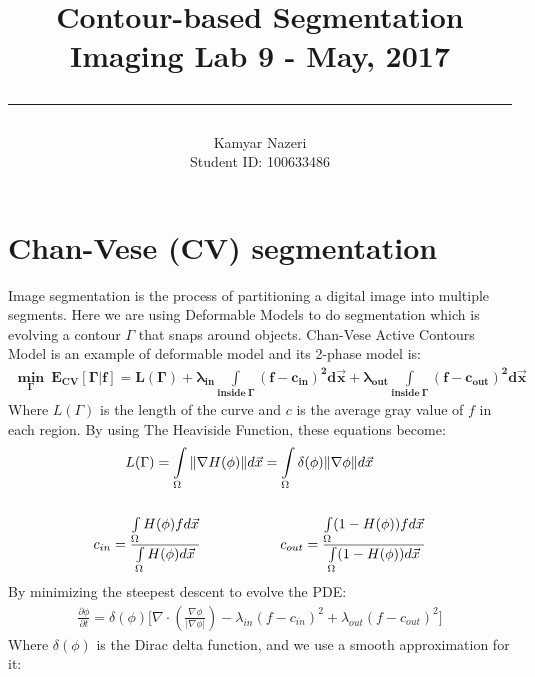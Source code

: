 \documentclass[a4paper,11pt]{article}
\newcommand\tab[1][4mm]{\hspace*{#1}}
\begin{document}
\title{
	\Huge \textbf {Contour-based Segmentation}
    \\ [0.2cm]
	\LARGE Imaging Lab 9 - May, 2017
    \\ [0.5cm]
    \hrule
}

\date{}

\author{
		\Large Kamyar Nazeri \\
		\large Student ID: 100633486 }

\maketitle
\newpage

\section*{Chan-Vese (CV) segmentation}
Image segmentation is the process of partitioning a digital image into multiple segments. Here we are using Deformable Models to do segmentation which is evolving a contour $\Gamma$ that snaps around objects. Chan-Vese Active Contours Model is an example of deformable model and its 2-phase model is:
\begin{align*}
\boldsymbol{\min \limits_{\Gamma}\ E_{CV}[\Gamma|f] = L(\Gamma) + \lambda_{in} \int\limits_{inside\ \Gamma}(f - c_{in})^2 d\vec{x} + \lambda_{out} \int\limits_{inside\ \Gamma}(f - c_{out})^2 d\vec{x}}
\end{align*}
Where $L(\Gamma)$ is the length of the curve and $c$ is the average gray value of $f$ in each region. By using The Heaviside Function, these equations become:
\begin{align*}
& \tab\tab L(\Gamma) = \int\limits_{\Omega} \Vert\nabla H(\phi)\Vert d\vec{x} = \int\limits_{\Omega} \delta(\phi) \Vert\nabla \phi \Vert d\vec{x} \\\\
& c_{in} = \frac{\int\limits_{\Omega} H(\phi)f d\vec{x}}{\int\limits_{\Omega} H(\phi) d\vec{x}} \tab\tab\tab\tab\tab
c_{out} = \frac{\int\limits_{\Omega} (1 - H(\phi))f d\vec{x}}{\int\limits_{\Omega} (1 - H(\phi)) d\vec{x}}
\end{align*}
By minimizing the steepest descent to evolve the PDE:
\begin{align*}
\frac{\partial \phi}{\partial t} = \delta(\phi) \bigg[ \nabla\cdot(\frac{\nabla\phi}{|\nabla\phi|}) -  \lambda_{in} (f - c_{in})^2 + \lambda_{out} (f - c_{out})^2 \bigg]
\end{align*}
Where $\delta(\phi)$ is the Dirac delta function, and we use a smooth approximation for it:
\end{document}
